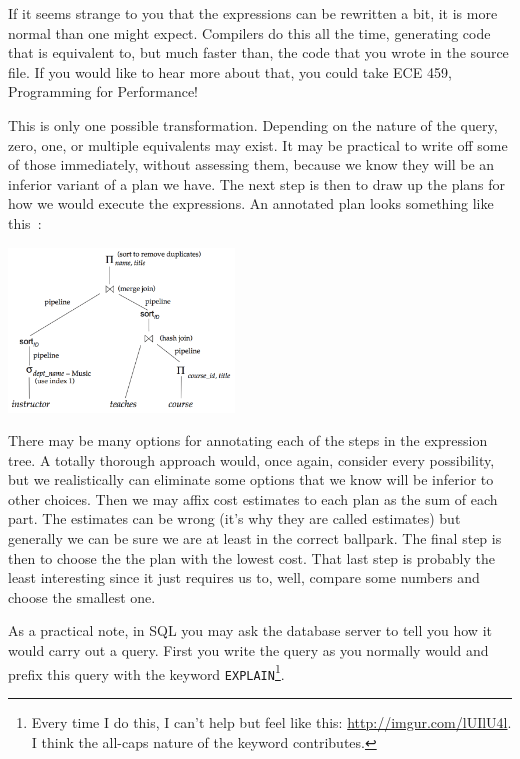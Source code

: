 If it seems strange to you that the expressions can be rewritten a bit, it is more normal than one might expect. Compilers do this all the time, generating code that is equivalent to, but much faster than, the code that you wrote in the source file. If you would like to hear more about that, you could take ECE 459, Programming for Performance! 

This is only one possible transformation. Depending on the nature of the query, zero, one, or multiple equivalents may exist. It may be practical to write off some of those immediately, without assessing them, because we know they will be an inferior variant of a plan we have. The next step is then to draw up the plans for how we would execute the expressions. An annotated plan looks something like this~\cite{dsc}:

\begin{center}
\includegraphics[width=0.45\textwidth]{images/optimization-2}
\end{center}

There may be many options for annotating each of the steps in the expression tree. A totally thorough approach would, once again, consider every possibility, but we realistically can eliminate some options that we know will be inferior to other choices. Then we may affix cost estimates to each plan as the sum of each part. The estimates can be wrong (it's why they are called estimates) but generally we can be sure we are at least in the correct ballpark. The final step is then to choose the the plan with the lowest cost. That last step is probably the least interesting since it just requires us to, well, compare some numbers and choose the smallest one.

As a practical note, in SQL you may ask the database server to tell you how it would carry out a query. First you write the query as you normally would and prefix this query with the keyword \texttt{EXPLAIN}\footnote{Every time I do this, I can't help but feel like this: \url{http://imgur.com/lUIlU4l}. I think the all-caps nature of the keyword contributes.}.

